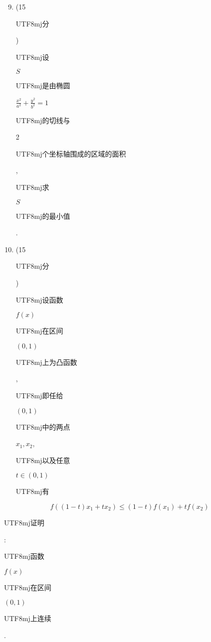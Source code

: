 \documentclass[10pt]{article}
\begin{document}
\begin{enumerate}
  \setcounter{enumi}{8}
  \item (15 \begin{CJK}{UTF8}{mj}分\end{CJK}) \begin{CJK}{UTF8}{mj}设\end{CJK} $S$ \begin{CJK}{UTF8}{mj}是由椭圆\end{CJK} $\frac{x^{2}}{a^{2}}+\frac{y^{2}}{b^{2}}=1$ \begin{CJK}{UTF8}{mj}的切线与\end{CJK} 2 \begin{CJK}{UTF8}{mj}个坐标轴围成的区域的面积\end{CJK}, \begin{CJK}{UTF8}{mj}求\end{CJK} $S$ \begin{CJK}{UTF8}{mj}的最小值\end{CJK}.

  \item (15 \begin{CJK}{UTF8}{mj}分\end{CJK}) \begin{CJK}{UTF8}{mj}设函数\end{CJK} $f(x)$ \begin{CJK}{UTF8}{mj}在区间\end{CJK} $(0,1)$ \begin{CJK}{UTF8}{mj}上为凸函数\end{CJK}, \begin{CJK}{UTF8}{mj}即任给\end{CJK} $(0,1)$ \begin{CJK}{UTF8}{mj}中的两点\end{CJK} $x_{1}, x_{2}$, \begin{CJK}{UTF8}{mj}以及任意\end{CJK} $t \in(0,1)$ \begin{CJK}{UTF8}{mj}有\end{CJK}

\end{enumerate}
$$
f\left((1-t) x_{1}+t x_{2}\right) \leqslant(1-t) f\left(x_{1}\right)+t f\left(x_{2}\right)
$$
\begin{CJK}{UTF8}{mj}证明\end{CJK}: \begin{CJK}{UTF8}{mj}函数\end{CJK} $f(x)$ \begin{CJK}{UTF8}{mj}在区间\end{CJK} $(0,1)$ \begin{CJK}{UTF8}{mj}上连续\end{CJK}.
\end{document}
